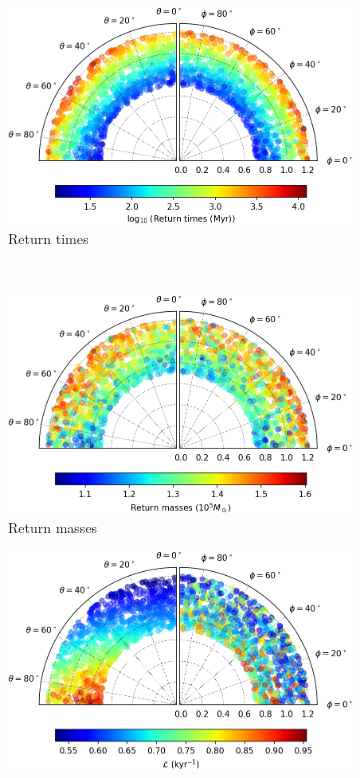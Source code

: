 \begin{figure}[h]
    \centering
    \begin{subfigure}[t]{0.4\textwidth}
        \includegraphics[width = \textwidth]{"../Files/Week 13/images/29_time"}
        \caption{Return times}
    \end{subfigure}
    ~ 
    \begin{subfigure}[t]{0.4\textwidth}
        \includegraphics[width=\textwidth]{"../Files/Week 13/images/29_mass"}
        \caption{Return masses}
    \end{subfigure}
    \begin{subfigure}[t]{0.4\textwidth}
        \includegraphics[width=\textwidth]{"../Files/Week 13/images/29_lyapunov"}

\end{subfigure}
\end{figure}
